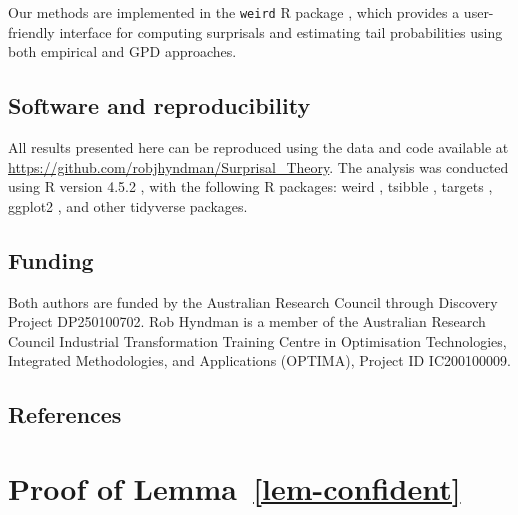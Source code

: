 \documentclass[
  12pt]{article}
\theoremstyle{definition}
\theoremstyle{plain}
\theoremstyle{plain}
\theoremstyle{plain}
\theoremstyle{remark}
\begin{document}
Our methods are implemented in the \texttt{weird} R package
\citep{Rweird}, which provides a user-friendly interface for computing
surprisals and estimating tail probabilities using both empirical and
GPD approaches.

\subsection*{Software and
reproducibility}\label{software-and-reproducibility}

All results presented here can be reproduced using the data and code
available at \url{https://github.com/robjhyndman/Surprisal_Theory}. The
analysis was conducted using R version 4.5.2 \citep{R}, with the
following R packages: weird \citep{Rweird}, tsibble \citep{Rtsibble},
targets \citep{targets, targetspaper}, ggplot2
\citep{ggplot2, ggplotbook}, and other tidyverse \citep{tidyverse}
packages.

\subsection*{Funding}\label{funding}

Both authors are funded by the Australian Research Council through
Discovery Project DP250100702. Rob Hyndman is a member of the Australian
Research Council Industrial Transformation Training Centre in
Optimisation Technologies, Integrated Methodologies, and Applications
(OPTIMA), Project ID IC200100009.

\subsection*{References}\label{references}

\renewcommand{\bibsection}{}


\newpage{}

\appendix

\section{\texorpdfstring{Proof of
Lemma~\ref{lem-confident}}{Proof of Lemma~}}\label{proof-of-lem-confident}
\end{document}
